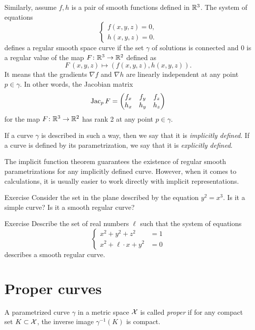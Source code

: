 Similarly, assume $f,h$ is a pair of smooth functions defined in $\mathbb{R}^3$.
The system of equations
\[\begin{cases}
   f(x,y,z)=0,
   \\
   h(x,y,z)=0.
  \end{cases}
\]
defines a regular smooth space curve if the set $\gamma$ of solutions is connected and $0$ is a regular value of the map $F\colon\mathbb{R}^3\to\mathbb{R}^2$ defined as
\[F\:(x,y,z)\mapsto (f(x,y,z),h(x,y,z)).\]
It means that the gradients $\nabla f$ and $\nabla h$ are linearly independent at any point $p\in \gamma$.
In other words, the Jacobian matrix
\[
\mathop{\rm Jac}\nolimits_pF=\begin{pmatrix}
f_x&f_y&f_z\\
h_x&h_y&h_z
\end{pmatrix}
\]
for the map $F\colon\mathbb{R}^3\to\mathbb{R}^2$ has rank 2 at any point $p \in \gamma$.

If a curve $\gamma$ is described in such a way,
then we say that it is \emph{implicitly defined}.
If a curve is defined by its parametrization, we say that it is \emph{explicitly defined}.

The implicit function theorem guarantees the existence of regular smooth parametrizations for any implicitly defined curve.
However, when it comes to calculations, it is usually easier to work directly with implicit representations. 

\begin{thm}{Exercise}\label{ex:y^2=x^3}
Consider the set in the plane described by the equation
$y^2=x^3$.
Is it a simple curve?
Is it a smooth regular curve?
\end{thm}

\begin{thm}{Exercise}\label{ex:viviani}
Describe the set of real numbers $\ell$
such that the system of equations
\[\begin{cases}
x^2+y^2+z^2&=1
\\
x^2+\ell\cdot x+y^2&=0
\end{cases}\]
describes a smooth regular curve.
\end{thm}

\section{Proper curves}\label{sec:proper-curves}

A parametrized curve $\gamma$ in a metric space $\mathcal{X}$ is called \emph{proper} if for any compact set $K \subset \mathcal{X}$, the inverse image $\gamma^{-1}(K)$ is compact.

